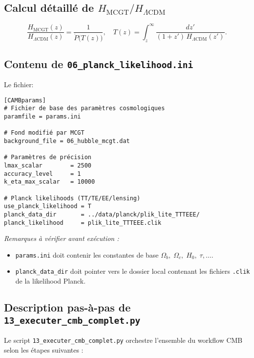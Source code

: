 \subsection{Calcul détaillé de $H_{\mathrm{MCGT}}/H_{\Lambda\mathrm{CDM}}$}
\[
  \frac{H_{\mathrm{MCGT}}(z)}{H_{\Lambda\mathrm{CDM}}(z)}
    = \frac{1}{\dot P\bigl(T(z)\bigr)},
  \quad
  T(z) = \int_{z}^{\infty}\frac{dz'}{(1+z')\,H_{\Lambda\mathrm{CDM}}(z')}.
\]

\subsection{Contenu de \texttt{06\_planck\_likelihood.ini}}
Le fichier:
\begin{verbatim}
[CAMBparams]
# Fichier de base des paramètres cosmologiques
paramfile = params.ini

# Fond modifié par MCGT
background_file = 06_hubble_mcgt.dat

# Paramètres de précision
lmax_scalar        = 2500
accuracy_level     = 1
k_eta_max_scalar   = 10000

# Planck likelihoods (TT/TE/EE/lensing)
use_planck_likelihood = T
planck_data_dir       = ../data/planck/plik_lite_TTTEEE/
planck_likelihood     = plik_lite_TTTEEE.clik
\end{verbatim}
\noindent\emph{Remarques à vérifier avant exécution :}
\begin{itemize}
  \item \texttt{params.ini} doit contenir les constantes de base
    \(\Omega_b,\;\Omega_c,\;H_0,\;\tau,\dots\).
  \item \texttt{planck\_data\_dir} doit pointer vers le dossier local
    contenant les fichiers \texttt{.clik} de la likelihood Planck.
\end{itemize}

\subsection{Description pas-à-pas de \texttt{13\_executer\_cmb\_complet.py}}

Le script \texttt{13\_executer\_cmb\_complet.py} orchestre l’ensemble du workflow CMB selon les étapes suivantes :

